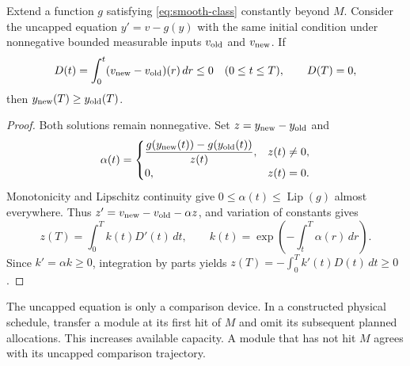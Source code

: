 \begin{lemma}
\label{lemma:postponement}
Extend a function \(g\) satisfying \eqref{eq:smooth-class} constantly beyond
\(M\). Consider the uncapped equation \(y'=v-g(y)\) with the same initial
condition under nonnegative bounded measurable inputs \(v_{\rm old}\) and
\(v_{\rm new}\). If
\[
 D(t)=\int_0^t(v_{\rm new}-v_{\rm old})(r)\,dr\leq0
 \quad(0\leq t\leq T),\qquad D(T)=0,
\]
then \(y_{\rm new}(T)\geq y_{\rm old}(T)\).
\end{lemma}
\begin{proof}
Both solutions remain nonnegative. Set \(z=y_{\rm new}-y_{\rm old}\) and
\[
 \alpha(t)=
 \begin{cases}
 \dfrac{g(y_{\rm new}(t))-g(y_{\rm old}(t))}{z(t)},&z(t)\ne0,\\
 0,&z(t)=0.
 \end{cases}
\]
Monotonicity and Lipschitz continuity give
\(0\leq\alpha(t)\leq\operatorname{Lip}(g)\) almost everywhere. Thus
\(z'=v_{\rm new}-v_{\rm old}-\alpha z\), and variation of constants gives
\[
 z(T)=\int_0^T k(t)D'(t)\,dt,\qquad
 k(t)=\exp\left(-\int_t^T\alpha(r)\,dr\right).
\]
Since \(k'=\alpha k\geq0\), integration by parts yields
\(z(T)=-\int_0^T k'(t)D(t)\,dt\geq0\).
\end{proof}

The uncapped equation is only a comparison device. In a constructed physical
schedule, transfer a module at its first hit of \(M\) and omit its subsequent
planned allocations. This increases available capacity. A module that has
not hit \(M\) agrees with its uncapped comparison trajectory.

